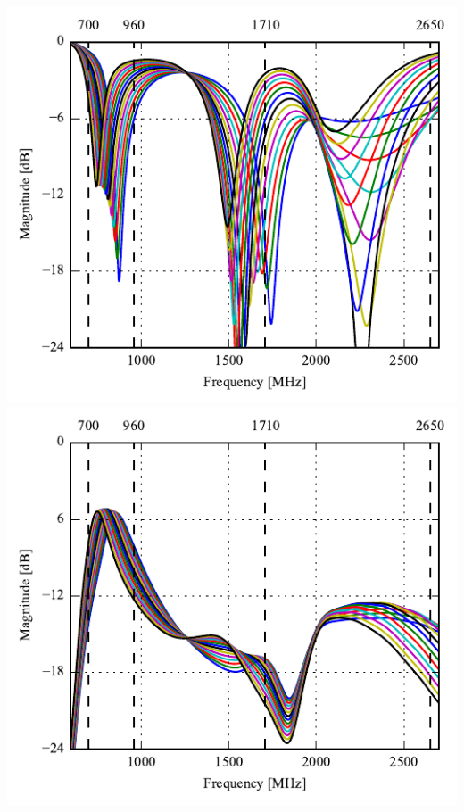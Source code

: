 \begin{frame}
\begin{minipage}[t]{0.49\linewidth}
    \includegraphics[width=0.78\linewidth]{img/henrik/triag/Csh2s22.pdf} \\
    \includegraphics[width=0.78\linewidth]{img/henrik/triag/Csh2s21.pdf} 

  \end{minipage}    


\end{frame}

